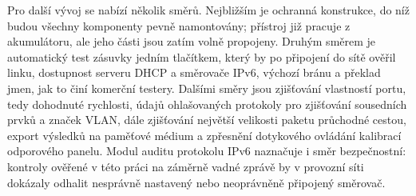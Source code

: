 Pro další vývoj se nabízí několik směrů. Nejbližším je ochranná konstrukce, do níž budou všechny komponenty pevně namontovány; přístroj již pracuje z akumulátoru, ale jeho části jsou zatím volně propojeny. Druhým směrem je automatický test zásuvky jedním tlačítkem, který by po připojení do sítě ověřil linku, dostupnost serveru DHCP a směrovače IPv6, výchozí bránu a překlad jmen, jak to činí komerční testery. Dalšími směry jsou zjišťování vlastností portu, tedy dohodnuté rychlosti, údajů ohlašovaných protokoly pro zjišťování sousedních prvků a značek VLAN, dále zjišťování největší velikosti paketu průchodné cestou, export výsledků na paměťové médium a zpřesnění dotykového ovládání kalibrací odporového panelu. Modul auditu protokolu IPv6 naznačuje i směr bezpečnostní: kontroly ověřené v této práci na záměrně vadné zprávě by v provozní síti dokázaly odhalit nesprávně nastavený nebo neoprávněně připojený směrovač.
